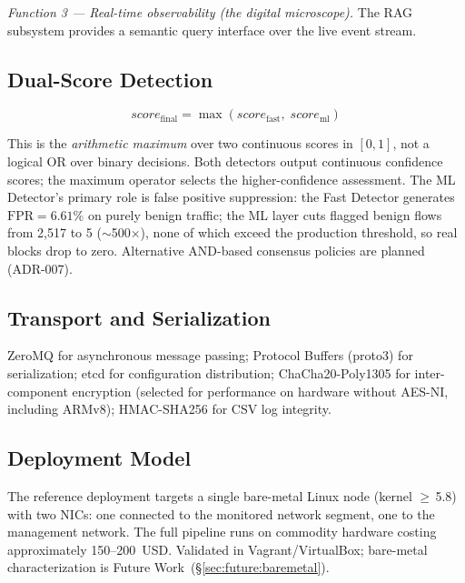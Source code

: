 \documentclass[11pt,a4paper]{article}
\begin{document}
    \emph{Function 3 --- Real-time observability (the digital microscope).}
    The RAG subsystem provides a semantic query interface over the live event stream.

    \subsection{Dual-Score Detection}

    \begin{equation}
        score_{\text{final}} = \max\!\left(score_{\text{fast}},\; score_{\text{ml}}\right)
        \label{eq:dualscore}
    \end{equation}

    This is the \emph{arithmetic maximum} over two continuous scores in $[0,1]$, not a logical
    OR over binary decisions. Both detectors output continuous confidence scores; the maximum
    operator selects the higher-confidence assessment. The ML Detector's primary role is false
    positive suppression: the Fast Detector generates $\text{FPR} = 6.61\%$ on purely benign
    traffic; the ML layer cuts flagged benign flows from 2,517 to 5 (${\sim}$500$\times$),
    none of which exceed the production threshold, so real blocks drop to zero. Alternative
    AND-based consensus policies are planned
    (ADR-007).

    \subsection{Transport and Serialization}

    ZeroMQ for asynchronous message passing; Protocol Buffers (proto3) for serialization; etcd
    for configuration distribution; ChaCha20-Poly1305 for inter-component encryption (selected
    for performance on hardware without AES-NI, including ARMv8); HMAC-SHA256 for CSV log
    integrity.

    \subsection{Deployment Model}
    \label{sec:deployment}

    The reference deployment targets a single bare-metal Linux node (kernel $\geq$\,5.8) with
    two NICs: one connected to the monitored network segment, one to the management network.
    The full pipeline runs on commodity hardware costing approximately 150--200~USD. Validated
    in Vagrant/VirtualBox; bare-metal characterization is Future Work~(\S\ref{sec:future:baremetal}).
\end{document}
